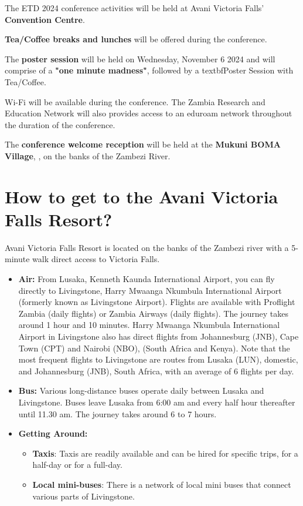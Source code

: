 The ETD 2024 conference activities will be held at Avani Victoria Falls' \textbf{Convention Centre}.

\textbf{Tea/Coffee breaks and lunches} will be offered during the conference.

The \textbf{poster session} will be held on Wednesday, November 6 2024 and will comprise of a \textbf{"one minute madness"}, followed by a textbf{Poster Session with Tea/Coffee}.

Wi-Fi will be available during the conference. The Zambia Research and Education Network will also provides access to an eduroam network throughout the duration of the conference.

The \textbf{conference welcome reception} will be held at the \textbf{Mukuni BOMA Village}, , on the banks of the Zambezi River.

\section{How to get to the Avani Victoria Falls Resort?}

Avani Victoria Falls Resort is located on the banks of the Zambezi river with a 5-minute walk direct access to Victoria Falls.

\begin{itemize}

	\item \textbf{Air:} From Lusaka, Kenneth Kaunda International Airport, you can fly directly to Livingstone, Harry Mwaanga Nkumbula International Airport (formerly known as Livingstone Airport). Flights are available with Proflight Zambia (daily flights) or Zambia Airways (daily flights). The journey takes around 1 hour and 10 minutes. Harry Mwaanga Nkumbula International Airport in Livingstone also has direct flights from Johannesburg (JNB), Cape Town (CPT) and Nairobi (NBO), (South Africa and Kenya). Note that the most frequent flights to Livingstone are routes from Lusaka (LUN), domestic, and Johannesburg (JNB), South Africa, with an average of 6 flights per day.
	\item \textbf{Bus:} Various long-distance buses operate daily between Lusaka and Livingstone. Buses leave Lusaka from 6:00 am and every half hour thereafter until 11.30 am. The journey takes around 6 to 7 hours.
	\item \textbf{Getting Around:}
	\begin{itemize}
	    \item \textbf{Taxis}: Taxis are readily available and can be hired for specific trips, for a half-day or for a full-day.
        \item \textbf{Local mini-buses}: There is a network of local mini buses that connect various parts of Livingstone.
    \end{itemize}
	
\end{itemize}

